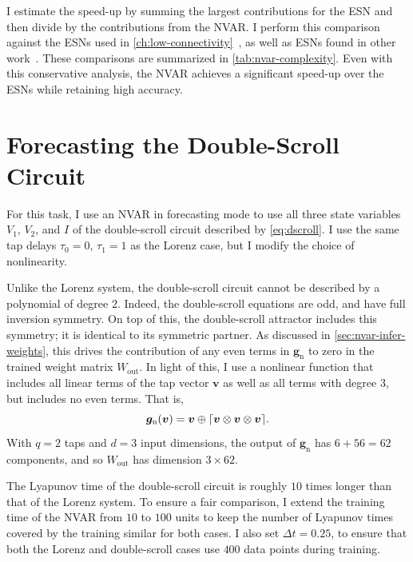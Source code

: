 I estimate the speed-up by summing the largest contributions for the
ESN and then divide by the contributions from the NVAR. I perform this
comparison against the ESNs used in
\cref{ch:low-connectivity}~\cite{griffith2019}, as well as ESNs found
in other work~\cite{pathak2017,lu2018}. These comparisons are
summarized in \cref{tab:nvar-complexity}. Even with this conservative
analysis, the NVAR achieves a significant speed-up over the ESNs while
retaining high accuracy.

\section{Forecasting the Double-Scroll Circuit}

For this task, I use an NVAR in forecasting mode to use all
three state variables $V_1$, $V_2$, and $I$ of the double-scroll
circuit described by \cref{eq:dscroll}. I use the same tap
delays $\tau_0 = 0$, $\tau_1 = 1$ as the Lorenz case, but I modify
the choice of nonlinearity.

Unlike the Lorenz system, the double-scroll circuit cannot be
described by a polynomial of degree $2$. Indeed, the double-scroll
equations are odd, and have full inversion symmetry. On top of this,
the double-scroll attractor includes this symmetry; it is identical to
its symmetric partner. As discussed in \cref{sec:nvar-infer-weights},
this drives the contribution of any even terms in $\bm{g}_\text{n}$ to
zero in the trained weight matrix $W_\text{out}$. In light of this, I
use a nonlinear function that includes all linear terms of the tap
vector $\bm{v}$ as well as all terms with degree $3$, but includes no
even terms. That is,
\begin{equation}
  \bm{g}_\text{n}(\bm{v}) = \bm{v} \oplus \lceil\bm{v} \otimes \bm{v} \otimes \bm{v}\rceil.
\end{equation}
With $q = 2$ taps and $d = 3$ input dimensions, the output of
$\bm{g}_\text{n}$ has $6 + 56 = 62$ components, and so $W_\text{out}$
has dimension $3 \times 62$.

The Lyapunov time of the double-scroll circuit is roughly $10$ times
longer than that of the Lorenz system. To ensure a fair comparison, I
extend the training time of the NVAR from $10$ to $100$ units to keep
the number of Lyapunov times covered by the training similar for both
cases. I also set $\Delta t = 0.25$, to ensure that both the Lorenz
and double-scroll cases use $400$ data points during training.

